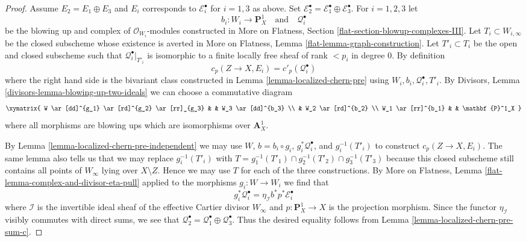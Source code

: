 \begin{proof}
\medskip\noindent
Assume $E_2 = E_1 \oplus E_3$ and $E_i$ corresponds to $\mathcal{E}_i^\bullet$
for $i = 1, 3$ as above. Set
$\mathcal{E}_2^\bullet = \mathcal{E}_1^\bullet \oplus \mathcal{E}_3^\bullet$.
For $i = 1, 2, 3$ let
$$
b_i : W_i \to \mathbf{P}^1_X
\quad\text{and}\quad
\mathcal{Q}_i^\bullet
$$
be the blowing up and complex of $\mathcal{O}_{W_i}$-modules constructed in
More on Flatness, Section \ref{flat-section-blowup-complexes-III}.
Let $T_i \subset W_{i, \infty}$ be the closed subscheme whose existence is
averted in More on Flatness, Lemma \ref{flat-lemma-graph-construction}.
Let $T'_i \subset T_i$ be the open and closed subscheme such that
$\mathcal{Q}_i^\bullet|_{T'_i}$ is isomorphic to a finite locally free
sheaf of rank $< p_i$ in degree $0$. By definition
$$
c_p(Z \to X, E_i) = c'_p(\mathcal{Q}_i^\bullet)
$$
where the right hand side is the bivariant class constructed in
Lemma \ref{lemma-localized-chern-pre} using
$W_i, b_i, \mathcal{Q}_i^\bullet, T'_i$.
By Divisors,  Lemma \ref{divisors-lemma-blowing-up-two-ideals} we
can choose a commutative diagram
$$
\xymatrix{
W \ar[dd]^{g_1} \ar[rd]^{g_2} \ar[rr]_{g_3} & & W_3 \ar[dd]^{b_3} \\
& W_2 \ar[rd]^{b_2} \\
W_1 \ar[rr]^{b_1} & & \mathbf{P}^1_X
}
$$
where all morphisms are blowing ups which are isomorphisms over
$\mathbf{A}^1_X$.

\medskip\noindent
By Lemma \ref{lemma-localized-chern-pre-independent} we may use
$W$, $b = b_i \circ g_i$, $g_i^*\mathcal{Q}_i^\bullet$, and
$g_i^{-1}(T'_i)$ to construct $c_p(Z \to X, E_i)$. The same lemma also
tells us that we may replace $g_i^{-1}(T'_i)$ with
$T = g_1^{-1}(T'_1) \cap g_2^{-1}(T'_2) \cap g_3^{-1}(T'_3)$
because this closed subscheme still contains all points of $W_\infty$
lying over $X \setminus Z$. Hence we may use $T$ for each of
the three constructions. By More on Flatness, Lemma
\ref{flat-lemma-complex-and-divisor-eta-pull}
applied to the morphisms $g_i : W \to W_i$ we find that
$$
g_i^*\mathcal{Q}_i^\bullet =
\eta_\mathcal{I}b^*p^*\mathcal{E}_i^\bullet
$$
where $\mathcal{I}$ is the invertible ideal sheaf of the effective
Cartier divisor $W_\infty$ and
$p :\mathbf{P}^1_X \to X$ is the projection morphism. Since the functor
$\eta_\mathcal{I}$ visibly commutes with direct sums, we see that
$\mathcal{Q}_2^\bullet = \mathcal{Q}_1^\bullet \oplus \mathcal{Q}_3^\bullet$.
Thus the desired equality follows from
Lemma \ref{lemma-localized-chern-pre-sum-c}.
\end{proof}


